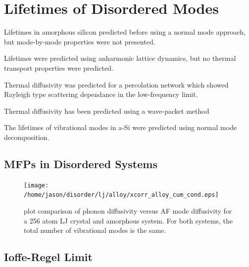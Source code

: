 \documentclass[aps,prb,preprint,superscriptaddress,amsmath,amssymb,floatfix]{revtex4}
\begin{document}
\section{\label{S:Lifetimes}Lifetimes of Disordered Modes}
Lifetimes in amorphous silicon predicted before using a normal mode 
approach, but mode-by-mode properties were not presented.
\cite{bickham_calculation_1998}

Lifetimes were predicted using anharmonic lattice dynamics, but no thermal 
transport properties were predicted.\cite{fabian_anharmonic_1996}

Thermal diffusivity was predicted for a percolation network which showed 
Rayleigh type scattering dependance in the low-frequency limit.
\cite{sheng_heat_1991}

Thermal diffusivity has been predicted using a wave-packet method

The lifetimes of vibrational modes in a-Si were predicted using normal 
mode decomposition.\cite{he_heat_2011}

\subsection{\label{S:Lifetimes:}MFPs in Disordered Systems}

\begin{figure}
\begin{center}
\texttt{[image: /home/jason/disorder/lj/alloy/xcorr\_alloy\_cum\_cond.eps]}
\vspace*{-5mm}
\end{center}
\caption{\label{FIG:phonon_diff} plot comparison of phonon diffusivity 
versus AF mode diffusivity for a 256 atom LJ crystal and amorphous system. 
For both systems, the total number of vibrational modes is the same.}
\end{figure}

\vspace*{100mm}

\subsection{\label{S:Lifetimes:}Ioffe-Regel Limit}
\end{document}
